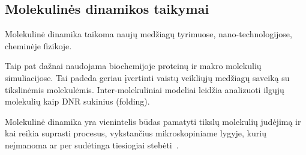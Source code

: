 \subsection{Molekulinės dinamikos taikymai}
\label{sec:molecular_dynamics_applications}

Molekulinė dinamika taikoma naujų medžiagų tyrimuose, nano-technologijose, cheminėje fizikoje.

Taip pat dažnai naudojama biochemijoje proteinų ir makro molekulių simuliacijose.
Tai padeda geriau įvertinti vaistų veikliųjų medžiagų saveiką su tikslinėmis molekulėmis.
Inter-molekuliniai modeliai leidžia analizuoti ilgųjų molekulių kaip DNR sukinius (folding).

Molekulinė dinamika yra vienintelis būdas pamatyti tikslų molekulių judėjimą ir kai reikia suprasti procesus,
vykstančius mikroskopiniame lygyje, kurių neįmanoma ar per sudėtinga tiesiogiai stebėti~\cite{art}.

